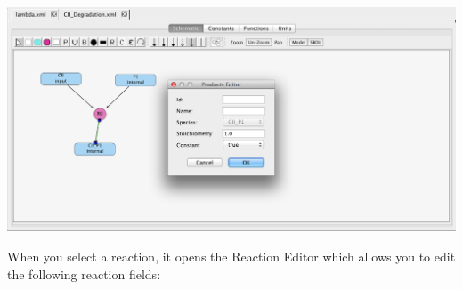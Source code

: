 \documentclass[titlepage,11pt]{article}
\begin{document}
\begin{center}
\includegraphics[width=155mm]{screenshots/product}
\end{center}

When you select a reaction, it opens the Reaction Editor which allows you to edit the following reaction fields:
\end{document}
